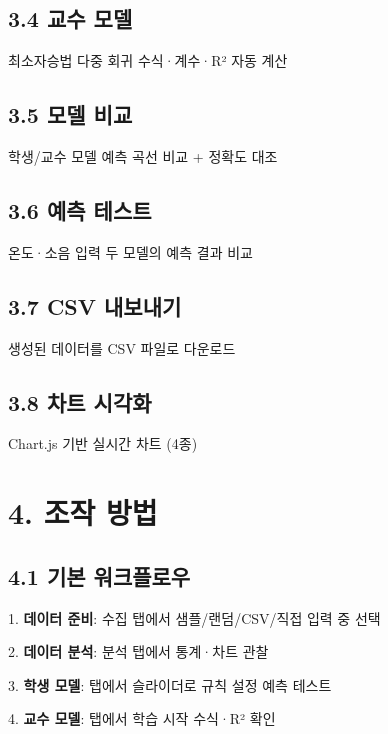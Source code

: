 \documentclass[11pt,a4paper]{article}
\begin{document}
\subsection*{3.4 교수 모델}

최소자승법 다중 회귀 \textrightarrow{} 수식·계수·R² 자동 계산


\subsection*{3.5 모델 비교}

학생/교수 모델 예측 곡선 비교 + 정확도 대조


\subsection*{3.6 예측 테스트}

온도·소음 입력 \textrightarrow{} 두 모델의 예측 결과 비교


\subsection*{3.7 CSV 내보내기}

생성된 데이터를 CSV 파일로 다운로드


\subsection*{3.8 차트 시각화}

Chart.js 기반 실시간 차트 (4종)



\section*{4. 조작 방법}

\subsection*{4.1 기본 워크플로우}

1. \textbf{데이터 준비}:  수집 탭에서 샘플/랜덤/CSV/직접 입력 중 선택

2. \textbf{데이터 분석}:  분석 탭에서 통계·차트 관찰

3. \textbf{학생 모델}:  탭에서 슬라이더로 규칙 설정 \textrightarrow{} 예측 테스트

4. \textbf{교수 모델}:  탭에서 학습 시작 \textrightarrow{} 수식·R² 확인
\end{document}
